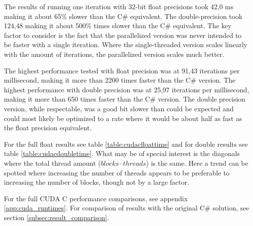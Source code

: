 The results of running one iteration with 32-bit float precisions took 42,0 ms making it about 65\% slower than the C\# equivalent.
The double-precision took 124,48 making it about 500\% times slower than the C\# equivalent.
The key factor to consider is the fact that the parallelized version was never intended to be faster with a single iteration.
Where the single-threaded version scales linearly with the amount of iterations, the parallelized version scales much better.

The highest performance tested with float precision was at 91,43 iterations per millisecond, making it more than 2200 times faster than the C\# version.
The highest performance with double precision was at 25,97 iterations per millisecond, making it more than 650 times faster than the C\# version.
The double precision version, while respectable, was a good bit slower than could be expected and could most likely be optimized to a rate where it would be about half as fast as the float precision equivalent.

For the full float results see table \ref{table:cudacfloattime} and for double results see table \ref{table:cudacdoubletime}.
What may be of special interest is the diagonals where the total thread amount ($blocks \cdot threads$) is the same.
Here a trend can be spotted where increasing the number of threads appears to be preferable to increasing the number of blocks, though not by a large factor.

For the full CUDA C performance comparisons, see appendix \ref{app:cuda_runtimes}.
For comparison of results with the original C\# solution, see section \ref{subsec:result_comparison}.


\begin{table}[h!]
\centering
{}
\caption{CUDA C calculations per ms with float precision\label{table:cudacfloattime}}
\end{table}



